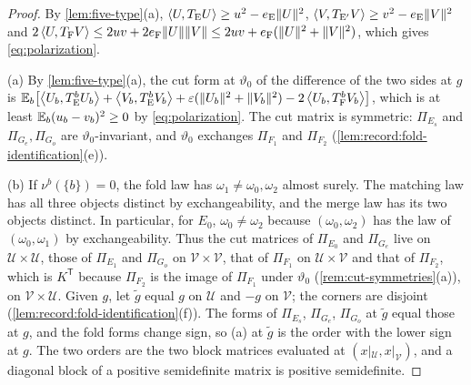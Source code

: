 \begin{proof}
By \cref{lem:five-type}(a),
$\left\langle U,T_{\rm E}U\right\rangle\ge u^2-e_{\rm E}\|U\|^2$, $\left\langle V,T_{\rm E'}V\right\rangle\ge v^2-e_{\rm E}\|V\|^2$
and $2\left\langle U,T_{\rm F}V\right\rangle\le2uv+2e_{\rm F}\|U\|\|V\|\le2uv+e_{\rm F}(\|U\|^2+\|V\|^2)$,
which gives \eqref{eq:polarization}.

(a) By \cref{lem:five-type}(a), the cut form at $\vartheta_0$ of the difference of
the two sides at $g$ is
$\mathbb E_b\bigl[\left\langle U_b,T_{\rm E}^bU_b\right\rangle+\left\langle V_b,T_{\rm E}^bV_b\right\rangle+\varepsilon(\|U_b\|^2+\|V_b\|^2)
-2\left\langle U_b,T_{\rm F}^bV_b\right\rangle\bigr]$, which is at least
$\mathbb E_b(u_b-v_b)^2\ge0$ by \eqref{eq:polarization}. The cut matrix is symmetric:
$\Pi_{E_s}$ and $\Pi_{G_e},\Pi_{G_o}$ are $\vartheta_0$-invariant, and
$\vartheta_0$ exchanges $\Pi_{F_1}$ and $\Pi_{F_2}$
(\cref{lem:record:fold-identification}(e)).

(b) If $\nu^b(\{b\})=0$, the fold law has
$\omega_1\ne\omega_0,\omega_2$ almost surely. The matching law has all three
objects distinct by exchangeability, and the merge law has its two objects
distinct. In particular, for $E_0$,
$\omega_0\ne\omega_2$ because $(\omega_0,\omega_2)$ has the law of
$(\omega_0,\omega_1)$ by exchangeability. Thus the
cut matrices of $\Pi_{E_0}$ and $\Pi_{G_e}$ live on $\mathcal U\times\mathcal U$,
those of $\Pi_{E_1}$ and $\Pi_{G_o}$ on $\mathcal V\times\mathcal V$, that of
$\Pi_{F_1}$ on $\mathcal U\times\mathcal V$ and that of $\Pi_{F_2}$, which is
$K^{\mathsf T}$ because $\Pi_{F_2}$ is the image of $\Pi_{F_1}$ under
$\vartheta_0$ (\cref{rem:cut-symmetries}(a)), on $\mathcal V\times\mathcal U$. Given $g$, let $\tilde g$ equal
$g$ on $\mathcal U$ and $-g$ on $\mathcal V$; the corners are disjoint
(\cref{lem:record:fold-identification}(f)). The forms of $\Pi_{E_s}$, $\Pi_{G_e}$,
$\Pi_{G_o}$ at $\tilde g$ equal those at $g$, and the fold forms change sign,
so (a) at $\tilde g$ is the order with the lower sign at $g$. The two orders are the two
block matrices evaluated at $(x|_{\mathcal U},x|_{\mathcal V})$, and a diagonal
block of a positive semidefinite matrix is positive semidefinite.


\end{proof}
